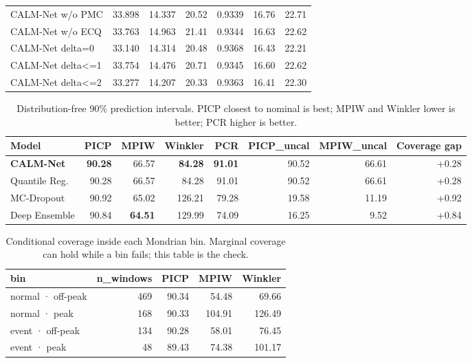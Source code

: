\begin{table}[!t]
\begin{tabular}{lrrrrrr}
CALM-Net w/o PMC & 33.898 & 14.337 & 20.52 & 0.9339 & 16.76 & 22.71 \\
CALM-Net w/o ECQ & 33.763 & 14.963 & 21.41 & 0.9344 & 16.63 & 22.62 \\
CALM-Net delta=0 & 33.140 & 14.314 & 20.48 & 0.9368 & 16.43 & 22.21 \\
CALM-Net delta<=1 & 33.754 & 14.476 & 20.71 & 0.9345 & 16.60 & 22.62 \\
CALM-Net delta<=2 & 33.277 & 14.207 & 20.33 & 0.9363 & 16.41 & 22.30 \\
\bottomrule
\end{tabular}
\end{table}

\begin{table}[!t]
\caption{Distribution-free 90\% prediction intervals. PICP closest to nominal is best; MPIW and Winkler lower is better; PCR higher is better.}
\label{tab:uncertainty}
\centering
\footnotesize
\begin{tabular}{lrrrrrrr}
\toprule
Model & PICP & MPIW & Winkler & PCR & PICP_uncal & MPIW_uncal & Coverage gap \\
\midrule
\textbf{CALM-Net} & \textbf{90.28} & 66.57 & \textbf{84.28} & \textbf{91.01} & 90.52 & 66.61 & +0.28 \\
Quantile Reg. & 90.28 & 66.57 & 84.28 & 91.01 & 90.52 & 66.61 & +0.28 \\
MC-Dropout & 90.92 & 65.02 & 126.21 & 79.28 & 19.58 & 11.19 & +0.92 \\
Deep Ensemble & 90.84 & \textbf{64.51} & 129.99 & 74.09 & 16.25 & 9.52 & +0.84 \\
\bottomrule
\end{tabular}
\end{table}

\begin{table}[!t]
\caption{Conditional coverage inside each Mondrian bin. Marginal coverage can hold while a bin fails; this table is the check.}
\label{tab:conditional_coverage}
\centering
\footnotesize
\begin{tabular}{lrrrr}
\toprule
bin & n_windows & PICP & MPIW & Winkler \\
\midrule
normal · off-peak & 469 & 90.34 & 54.48 & 69.66 \\
normal · peak & 168 & 90.33 & 104.91 & 126.49 \\
event · off-peak & 134 & 90.28 & 58.01 & 76.45 \\
event · peak & 48 & 89.43 & 74.38 & 101.17 \\
\bottomrule
\end{tabular}
\end{table}
